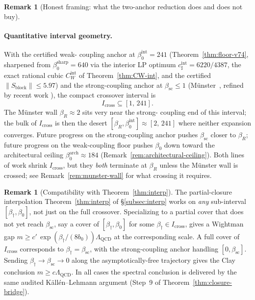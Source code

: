 \documentclass[11pt]{article}
\theoremstyle{definition}
\newtheorem{remark}[theorem]{Remark}
\newcommand{\Lam}{\Lambda_{\mathrm{QCD}}}
\newcommand{\betasc}{\beta_{\mathrm{sc}}}
\begin{document}
\begin{remark}[Honest framing: what the two-anchor reduction does and
does not buy]
\paragraph{Quantitative interval geometry.}  With the certified weak-
coupling anchor at $\beta_0^{\mathrm{int}}=241$
\textup{(}Theorem~\ref{thm:floor-v74}, sharpened from
$\beta_0^{\mathrm{sharp}}=640$ via the interior LP optimum
$c_\sharp^{\mathrm{int}}=6220/4387$, the exact rational cubic
$C_W^{\mathrm{int}}$ of Theorem~\ref{thm:CW-int}, and the certified
$\|S_{\mathrm{block}}\|\le 5.97$\textup{)} and the strong-coupling
anchor at $\betasc\le 1$
\textup{(}M\"unster~\cite{Munster81}, refined by recent work
\cite{SZZ22,CNS25}\textup{)}, the compact crossover interval is
\[
I_{\mathrm{cross}}\subseteq[1,\,241].
\]
The M\"unster wall $\beta_R\approx 2$ sits very near the strong-
coupling end of this interval; the bulk of $I_{\mathrm{cross}}$ is
then the desert $[\beta_R,\beta_0^{\mathrm{int}}]\approx[2,\,241]$
where neither expansion converges.  Future progress on the
strong-coupling anchor pushes $\betasc$ closer to $\beta_R$; future
progress on the weak-coupling floor pushes $\beta_0$ down toward
the architectural ceiling $\beta_0^{\mathrm{arch}}\approx 184$
\textup{(}Remark~\ref{rem:architectural-ceiling}\textup{)}.  Both
lines of work shrink $I_{\mathrm{cross}}$, but they
\emph{both} terminate at $\beta_R$ unless the M\"unster wall is
crossed; see Remark~\ref{rem:munster-wall} for what crossing it
requires.
\end{remark}

\begin{remark}[Compatibility with Theorem~\ref{thm:interp}]
\label{rem:two-anchor-vs-interp}
The partial-closure interpolation Theorem~\ref{thm:interp} of
\S\ref{subsec:interp} works on \emph{any} sub-interval
$[\beta_\dagger,\beta_0]$, not just on the full crossover.
Specializing to a partial cover that does not yet reach $\betasc$,
say a cover of $[\beta_\dagger,\beta_0]$ for some
$\beta_\dagger\in I_{\mathrm{cross}}$, gives a Wightman gap
$m\ge c'\,\exp(\beta_\dagger/(8b_0))\Lam$ at the corresponding scale.
A full cover of $I_{\mathrm{cross}}$ corresponds to
$\beta_\dagger=\betasc$, with the strong-coupling anchor handling
$[0,\betasc]$.  Sending $\beta_\dagger\to\betasc\to 0$ along the
asymptotically-free trajectory gives the Clay conclusion
$m\ge c\Lam$.  In all cases the spectral conclusion is delivered by
the same audited K\"all\'en--Lehmann argument
\textup{(}Step~9 of Theorem~\ref{thm:closure-bridge}\textup{)}.
\end{remark}
\end{document}
